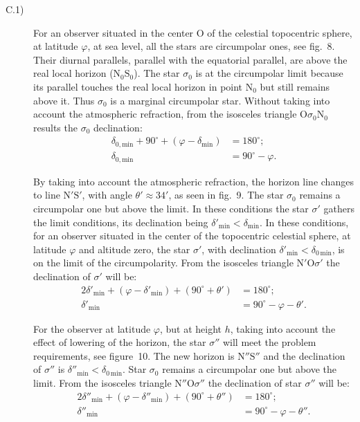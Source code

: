 \begin{description}
\item[C.1)] For an observer situated in the center O of the celestial
  topocentric sphere, at latitude $\varphi$, at sea level, all the stars are
  circumpolar ones, see fig.~8. Their diurnal parallels, parallel with the
  equatorial parallel, are above the real local horizon
  ($\mathrm{N}_0\mathrm{S}_0$). The star $\sigma_0$ is at the circumpolar
  limit because its parallel touches the real local horizon in point
  $\mathrm{N}_0$ but still remains above it. Thus $\sigma_0$ is a marginal
  circumpolar star. Without taking into account the atmospheric refraction,
  from the isosceles triangle $\mathrm{O}\sigma_0\mathrm{N}_0$ results the
  $\sigma_0$ declination:
  \begin{align*}
  \delta_{0,\mathrm{min}} + 90^\circ
    + (\varphi - \delta_{\mathrm{min}}) &= 180^\circ;
  \\
  \delta_{0,\mathrm{min}} &= 90^\circ - \varphi.
  \end{align*}

  By taking into account the atmospheric refraction, the horizon line
  changes to line $\mathrm{N}'\mathrm{S}'$, with angle
  $\theta' \approx 34'$, as seen in fig.~9. The star $\sigma_0$ remains a
  circumpolar one but above the limit. In these conditions the star
  $\sigma'$ gathers the limit conditions, its declination being
  $\delta'_{\mathrm{min}} < \delta_{\mathrm{min}}$. In these conditions, for
  an observer situated in the center of the topocentric celestial sphere, at
  latitude $\varphi$ and altitude zero, the star $\sigma'$, with declination
  $\delta'_{\mathrm{min}} < \delta_{0\,\mathrm{min}}$, is on the limit of
  the circumpolarity. From the isosceles triangle
  $\mathrm{N}'\mathrm{O}\sigma'$ the declination of $\sigma'$ will be:
  \begin{align*}
  2\delta'_{\mathrm{min}} + (\varphi - \delta'_{\mathrm{min}})
    + (90^\circ + \theta') &= 180^\circ;\\
  \delta'_{\mathrm{min}} &= 90^\circ - \varphi - \theta'.
  \end{align*}

  For the observer at latitude $\varphi$, but at height $h$, taking into
  account the effect of lowering of the horizon, the star $\sigma''$ will
  meet the problem requirements, see figure~10. The new horizon is
  $\mathrm{N}''\mathrm{S}''$ and the declination of $\sigma''$ is
  $\delta''_{\mathrm{min}} < \delta_{0\,\mathrm{min}}$. Star $\sigma_0$
  remains a circumpolar one but above the limit. From the isosceles triangle
  $\mathrm{N}''\mathrm{O}\sigma''$ the declination of star $\sigma''$ will
  be:
  \begin{align*}
  2\delta''_{\mathrm{min}} + (\varphi - \delta''_{\mathrm{min}})
    + (90^\circ + \theta'') &= 180^\circ;\\
  \delta''_{\mathrm{min}} &= 90^\circ - \varphi - \theta''.
  \end{align*}


\end{description}
